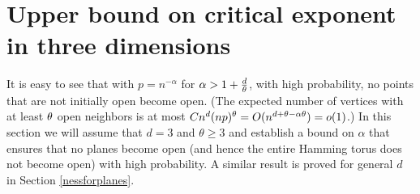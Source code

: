 \section{Upper bound on critical exponent in three dimensions}
\label{3d-upper}
It is easy to see that with $p = n^{-\alpha}$ for $\alpha > 1 + \frac{d}{\theta}$, with high probability, no points that are not initially open become open.  (The expected number of vertices with at least $\theta$ open neighbors is at most $Cn^d (np)^\theta = O(n^{d+\theta - \alpha\theta}) = o(1)$.)
In this section we will assume that $d=3$ and $\theta \ge 3$ and establish a bound on $\alpha$ that 
ensures that no planes become open (and hence the entire Hamming torus does not become open) 
with high probability. A similar
result is proved for general $d$ in Section \ref{nessforplanes}.

